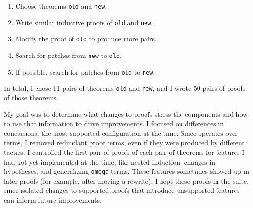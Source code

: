 \begin{enumerate}
\item Choose theorems \lstinline{old} and \lstinline{new}.
\item Write similar inductive proofs of \lstinline{old} and \lstinline{new}.
\item Modify the proof of \lstinline{old} to produce more pairs.
\item Search for patches from \lstinline{new} to \lstinline{old}.
\item If possible, search for patches from \lstinline{old} to \lstinline{new}.
\end{enumerate}
In total, I chose 11 pairs of theorems \lstinline{old} and \lstinline{new}, and I wrote
50 pairs of proofs of those theorems.

\iffalse
For example, one pair of theorems \lstinline{old} and \lstinline{new} was a 
simplification of the auxiliary lemmas
that we encountered in the case study in Section~\ref{sec:foundations}.
For the first proof of \lstinline{old}, we added a rewrite, like in the case study:

\begin{lstlisting}[language=coq]
    (@\diff{rewrite <- plus\_n\_O.}@) rewrite -> plus_comm.
\end{lstlisting}

For the second proof of \lstinline{old}, we commuted the rewrites:

\begin{lstlisting}[language=coq]
    rewrite -> plus_comm. (@\diff{rewrite <- plus\_n\_O.}@)
\end{lstlisting} 

We then searched for patches in both directions,
since the conclusions of \lstinline{old}
and \lstinline{new} were propositionally equal.
\fi

My goal was to determine what changes to proofs stress the components
and how to use that information to drive improvements.
I focused on differences in conclusions, the most supported configuration at the time.
Since \sysname operates over terms,
I removed redundant proof terms, even if they were produced by different tactics.
I controlled the first pair of proofs of each pair of theorems for features I had not yet implemented at the time,
like nested induction, changes in hypotheses, and generalizing \lstinline{omega} terms.
These features sometimes showed up in later proofs (for example, after moving a rewrite);
I kept these proofs in the suite, since isolated changes to supported proofs that
introduce unsupported features can inform future improvements.	

